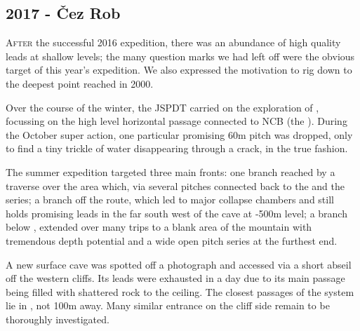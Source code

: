\newpage
  
\begin{tcolorbox}

\chapter{2017 - Čez Rob}
	
	\lettrine{A}{fter} the successful 2016 expedition, there was an abundance of high quality leads at shallow levels; the many question marks we had left off were the obvious target of this year's expedition. We also expressed the motivation to rig down to the deepest point reached in 2000.

	Over the course of the winter, the JSPDT carried on the exploration of , focussing on the high level horizontal passage connected to NCB (the ). During the October super action, one particular promising 60m pitch was dropped, only to find a tiny trickle of water disappearing through a crack, in the true  fashion.

	The summer expedition targeted three main fronts: one branch reached by a traverse over the  area which, via several pitches connected back to the  and the  series; a branch off the  route, which led to major collapse chambers and still holds promising leads in the far south west of the cave at -500m level; a branch below , extended over many trips to a blank area of the mountain with tremendous depth potential and a wide open pitch series at the furthest end.

	A new surface cave was spotted off a photograph and accessed via a short abseil off the western cliffs. Its leads were exhausted in a day due to its main passage being filled with shattered rock to the ceiling. The closest passages of the  system lie in , not 100m away. Many similar entrance on the cliff side remain to be thoroughly investigated.

\end{tcolorbox}

